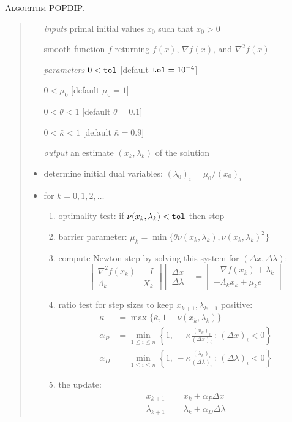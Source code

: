 \documentclass[11pt]{article}
\newcommand{\grad}{\nabla}
\begin{document}
\bigskip
\noindent \textsc{Algorithm POPDIP.}
\begin{quote}
\begin{itemize}
\item[\emph{inputs}]  primal initial values $x_0$ such that $x_0 > 0$
\item[]  smooth function $f$ returning $f(x)$, $\grad f(x)$, and $\grad^2 f(x)$
\item[\emph{parameters}]  $0<\text{\texttt{tol}}$ [default $\text{\texttt{tol}}=10^{-4}$]
\item[]  $0<\mu_0$ [default $\mu_0=1$]
\item[]  $0<\theta<1$ [default $\theta=0.1$]
\item[]  $0<\bar\kappa<1$ [default $\bar\kappa=0.9$]
\item[\emph{output}]  an estimate $(x_k,\lambda_k)$ of the solution
\item  determine initial dual variables: $(\lambda_0)_i = \mu_0 / (x_0)_i$
\item  for $k=0,1,2,\dots$
    \renewcommand{\labelenumi}{(\roman{enumi})}
    \begin{enumerate}
    \item optimality test: if $\nu(x_k,\lambda_k)<\text{\texttt{tol}}$ then stop
    \item barrier parameter: $\mu_k = \min\{\theta \nu(x_k,\lambda_k),\nu(x_k,\lambda_k)^2\}$
    \item compute Newton step by solving this system for $(\Delta x,\Delta \lambda)$:
    $$\begin{bmatrix}
\grad^2 f(x_k) & - I \\
\Lambda_k & X_k
\end{bmatrix}
\begin{bmatrix}
\Delta x \\
\Delta \lambda
\end{bmatrix}
=
\begin{bmatrix}
-\grad f(x_k) + \lambda_k \\
-\Lambda_k x_k + \mu_k e
\end{bmatrix}$$
    \item ratio test for step sizes to keep $x_{k+1},\lambda_{k+1}$ positive:
\begin{align*}
\kappa &= \max\{\bar\kappa,1-\nu(x_k,\lambda_k)\} \\
\alpha_P &= \min_{1\le i\le n} \left\{1, \,-\kappa \frac{(x_k)_i}{(\Delta x)_i} \,:\, (\Delta x)_i < 0\right\} \\
\alpha_D &= \min_{1\le i\le n} \left\{1, \,-\kappa \frac{(\lambda_k)_i}{(\Delta \lambda)_i} \,:\, (\Delta \lambda)_i < 0\right\}
\end{align*}
    \item the update:
\begin{align*}
x_{k+1} &= x_k + \alpha_P \Delta x \\
\lambda_{k+1} &= \lambda_k + \alpha_D \Delta \lambda
\end{align*}
    \end{enumerate}
\end{itemize}
\end{quote}
\end{document}
